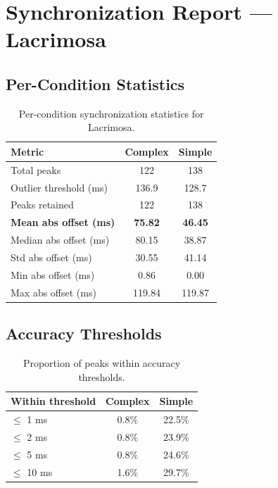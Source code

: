 
\section*{Synchronization Report --- Lacrimosa}

\subsection*{Per-Condition Statistics}

\begin{table}[h!]
\centering
\begin{tabular}{|l|c|c|}
\hline
Metric & Complex & Simple \\
\hline
Total peaks & 122 & 138 \\
Outlier threshold (ms) & 136.9 & 128.7 \\
Peaks retained & 122 & 138 \\
\textbf{Mean abs offset (ms)} & \textbf{75.82} & \textbf{46.45} \\
Median abs offset (ms) & 80.15 & 38.87 \\
Std abs offset (ms) & 30.55 & 41.14 \\
Min abs offset (ms) & 0.86 & 0.00 \\
Max abs offset (ms) & 119.84 & 119.87 \\
\hline
\end{tabular}
\caption{Per-condition synchronization statistics for Lacrimosa.}
\label{tab:sync_stats}
\end{table}

\subsection*{Accuracy Thresholds}

\begin{table}[h!]
\centering
\begin{tabular}{|l|c|c|}
\hline
Within threshold & Complex & Simple \\
\hline
$\leq$ 1 ms & 0.8\% & 22.5\% \\
$\leq$ 2 ms & 0.8\% & 23.9\% \\
$\leq$ 5 ms & 0.8\% & 24.6\% \\
$\leq$ 10 ms & 1.6\% & 29.7\% \\
\hline
\end{tabular}
\caption{Proportion of peaks within accuracy thresholds.}
\label{tab:sync_accuracy}
\end{table}

